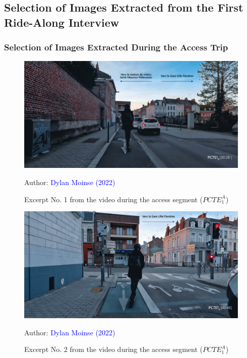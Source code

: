     \newpage
\subsection{Selection of Images Extracted from the First Ride-Along Interview}
    \label{annexes:photos-pcte1}

\subsubsection{Selection of Images Extracted During the Access Trip}

    \begin{figure}[h!]\vspace*{4pt}
        \caption*{Excerpt No. 1 from the video during the access segment (\(PCTE^{A}_{1}\))}
        \centerline{\includegraphics[width=0.75\columnwidth]{src/Figures/Annexes/Extrait_Video_PCTE1_Access_1.jpg}}
        \vspace{5pt}
        \begin{flushright}\scriptsize{
        Author: \textcolor{blue}{Dylan Moinse (2022)}
        }\end{flushright}
    \end{figure}

    \begin{figure}[h!]\vspace*{4pt}
        \caption*{Excerpt No. 2 from the video during the access segment (\(PCTE^{A}_{1}\))}
        \centerline{\includegraphics[width=0.75\columnwidth]{src/Figures/Annexes/Extrait_Video_PCTE1_Access_2.jpg}}
        \vspace{5pt}
        \begin{flushright}\scriptsize{
        Author: \textcolor{blue}{Dylan Moinse (2022)}
        }\end{flushright}
    \end{figure}

